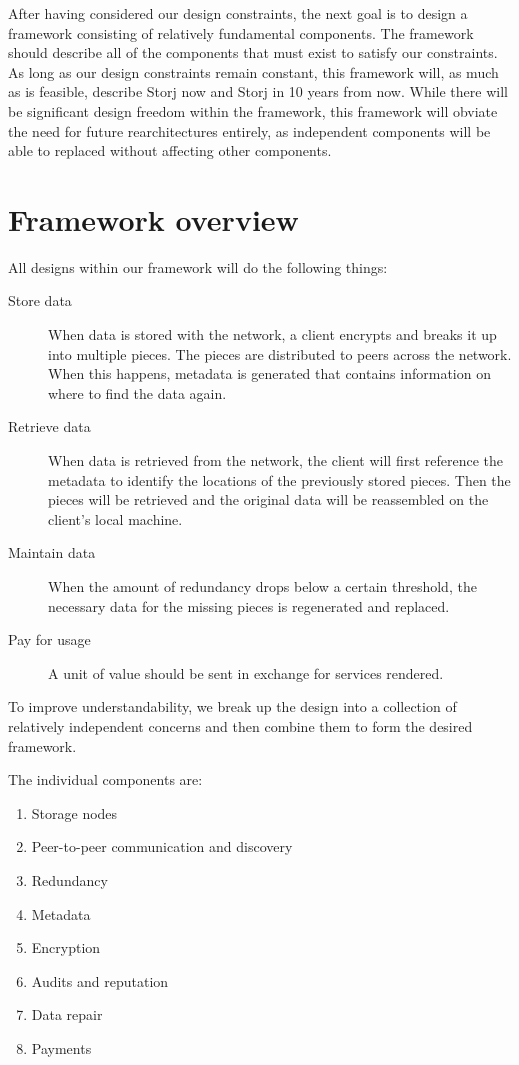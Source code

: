 \documentclass[11pt,fleqn,openany]{book}
\begin{document}
After having considered our design constraints, the next goal is to design
a framework consisting of relatively fundamental components.
The framework should describe
all of the components that must exist to satisfy our constraints.
As long as our design constraints remain constant, this framework will, as
much as is feasible, describe Storj now and Storj in 10 years from now.
While there will be significant design freedom within the framework,
this framework will obviate the need for future rearchitectures entirely, as
independent components will be able to replaced without affecting other
components.

\section{Framework overview}

All designs within our framework will do the following things:

\begin{description}

\item[Store data] When data is stored with the network, a client encrypts
and breaks it up into multiple pieces. The pieces are distributed
to peers across the network. When this happens, metadata is generated that
contains information on where to find the data again.

\item[Retrieve data] When data is retrieved from the network,
the client will first reference the metadata to identify the locations of the
previously stored pieces.
Then the pieces will be retrieved and the original data will be reassembled
on the client's local machine.

\item[Maintain data] When the amount of redundancy drops below a certain
threshold, the necessary data for the missing pieces is regenerated and
replaced.

\item[Pay for usage] A unit of value should be sent in exchange for
services rendered.

\end{description}

To improve understandability, we break up the design into a collection of
relatively independent concerns and then combine them to form the desired
framework.

The individual components are:

\begin{enumerate}
\item Storage nodes
\item Peer-to-peer communication and discovery
\item Redundancy
\item Metadata
\item Encryption
\item Audits and reputation
\item Data repair
\item Payments
\end{enumerate}
\end{document}
